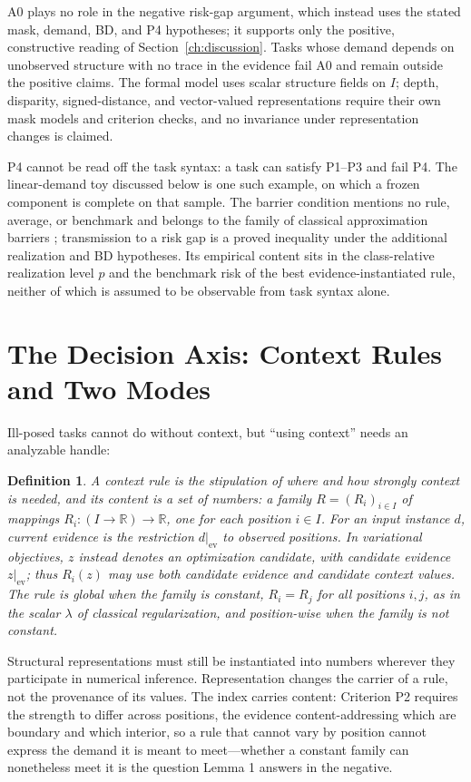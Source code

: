 \documentclass[twoside,11pt]{article}
\newtheorem{defn}{Definition}
\newcommand{\ev}{\mathrm{ev}}
\begin{document}
A0 plays no role in the negative risk-gap argument, which instead uses the stated mask, demand, BD, and P4 hypotheses; it supports only the positive, constructive reading of Section~\ref{ch:discussion}. Tasks whose demand depends on unobserved structure with no trace in the evidence fail A0 and remain outside the positive claims. The formal model uses scalar structure fields on $I$; depth, disparity, signed-distance, and vector-valued representations require their own mask models and criterion checks, and no invariance under representation changes is claimed.

P4 cannot be read off the task syntax: a task can satisfy P1--P3 and fail P4. The linear-demand toy discussed below is one such example, on which a frozen component is complete on that sample. The barrier condition mentions no rule, average, or benchmark and belongs to the family of classical approximation barriers \citep{kolmogorov1936,pinkus1985}; transmission to a risk gap is a proved inequality under the additional realization and BD hypotheses. Its empirical content sits in the class-relative realization level $p$ and the benchmark risk of the best evidence-instantiated rule, neither of which is assumed to be observable from task syntax alone.

\section{The Decision Axis: Context Rules and Two Modes}
\label{ch:axis}%

Ill-posed tasks cannot do without context, but ``using context'' needs an analyzable handle:

\begin{defn}
A \emph{context rule} is the stipulation of where and how strongly context is needed, and its content is a set of numbers: a family $R = (R_i)_{i \in I}$ of mappings $R_i : (I \to \mathbb{R}) \to \mathbb{R}$, one for each position $i \in I$. For an input instance $d$, current evidence is the restriction $d|_{\ev}$ to observed positions. In variational objectives, $z$ instead denotes an optimization candidate, with candidate evidence $z|_{\ev}$; thus $R_i(z)$ may use both candidate evidence and candidate context values. The rule is \emph{global} when the family is constant, $R_i = R_j$ for all positions $i, j$, as in the scalar $\lambda$ of classical regularization, and \emph{position-wise} when the family is not constant.
\end{defn}

Structural representations must still be instantiated into numbers wherever they participate in numerical inference. Representation changes the carrier of a rule, not the provenance of its values. The index carries content: Criterion P2 requires the strength to differ across positions, the evidence content-addressing which are boundary and which interior, so a rule that cannot vary by position cannot express the demand it is meant to meet---whether a constant family can nonetheless meet it is the question Lemma 1 answers in the negative.
\end{document}
